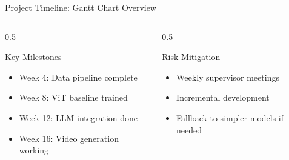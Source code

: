 \documentclass[aspectratio=169]{beamer}
\begin{document}
\begin{frame}{Project Timeline: Gantt Chart Overview}
    \begin{columns}
        \begin{column}{0.5\textwidth}
            \begin{block}{Key Milestones}
                \begin{itemize}
                    \item Week 4: Data pipeline complete
                    \item Week 8: ViT baseline trained
                    \item Week 12: LLM integration done
                    \item Week 16: Video generation working
                \end{itemize}
            \end{block}
        \end{column}
        \begin{column}{0.5\textwidth}
            \begin{block}{Risk Mitigation}
                \begin{itemize}
                    \item Weekly supervisor meetings
                    \item Incremental development
                    \item Fallback to simpler models if needed
                \end{itemize}
            \end{block}
        \end{column}
    \end{columns}
\end{frame}
\end{document}
